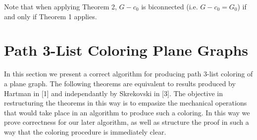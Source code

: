 \documentclass[12pt,a4paper]{article}
\begin{document}
\noindent Note that when applying Theorem 2, $G-c_0$ is biconnected
(i.e. $G-c_0=G_0$) if and only if Theorem 1 applies.

\section{Path 3-List Coloring Plane Graphs}

In this section we present a correct algorithm for producing path $3$-list coloring of a plane graph. The following
theorems are equivalent to results produced by Hartman in [1] and independantly by Skrekovski in [3]. The objective in restructuring
the theorems in this way is to empasize the mechanical operations that would take place in an algorithm
to produce such a coloring. In this way we prove correctness for our later algorithm, as well as structure the
proof in such a way that the coloring procedure is immediately clear.\\
\end{document}
